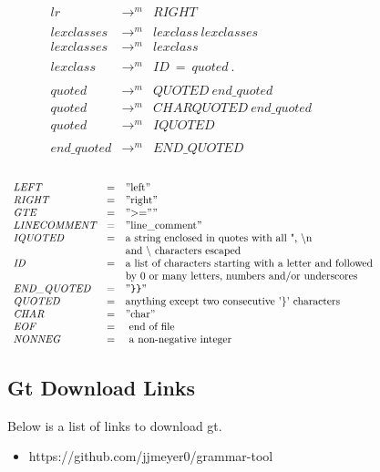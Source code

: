 \[\begin{array}{lll}
\textit{lr} & \to^m & \textit{RIGHT} \\ \\
\textit{lexclasses} & \to^m & \textit{lexclass}\ \textit{lexclasses} \\
\textit{lexclasses} & \to^m & \textit{lexclass} \\ \\
\textit{lexclass} & \to^m & \textit{ID}\ =\ \textit{quoted}\ . \\ \\
\textit{quoted} & \to^m & \textit{QUOTED}\ \textit{end\_quoted} \\
\textit{quoted} & \to^m & \textit{CHAR} \textit{QUOTED}\ \textit{end\_quoted} \\
\textit{quoted} & \to^m & \textit{IQUOTED} \ \ \ \ \ \ \ \ \ \ \ \ \ \ \ \ \ \ \ \ \ \ \ \ \ \ \ \ \ \ \ \ \ \ \ \ \ \ \ \ \ \ \ \ \ \ \ \ \ \ \ \ \ \ \ \ \ \ \ \ \ \ \ \ \ \ \ \ \ \ \ \ \ \ \\ \\
\textit{end\_quoted} & \to^m & \textit{END\_QUOTED}\\ \\ 
\end{array}
\]


\[
\begin{array}{lll}
\textit{LEFT} & = & "\textnormal{left}" \ \ \ \ \ \ \ \ \ \ \ \ \ \ \ \ \ \ \ \ \ \ \ \ \ \ \ \ \ \ \ \ \ \ \ \ \ \ \ \ \ \ \ \ \ \ \ \ \ \ \ \ \ \ \ \ \ \ \ \ \ \ \ \ \ \ \ \ \ \ \ \ \ \ \ \ \ \ \ \ \ \ \ \ \ \ \ \ \\
\textit{RIGHT} & = & "\textnormal{right}" \\
\textit{GTE} & = & "\textnormal{$>$=}"" \\
\textit{LINECOMMENT} & = & "\textnormal{line\_comment}"\\
\textit{IQUOTED} & = & \textnormal{a string enclosed in quotes with all ",  \textbackslash n} \\
\ & \  & \textnormal{and \textbackslash \ characters escaped} \\
\textit{ID} & = & \textnormal{a list of characters starting with a letter and followed } \\
\  & \  & \textnormal{by 0 or many letters, numbers and/or underscores} \\
\textit{END\_QUOTED} & = & "\texttt{\}\}}" \\
\textit{QUOTED} & = & \textnormal{anything except two consecutive '\}' characters} \\
\textit{CHAR} & = & "\textnormal{char}" \\
\textit{EOF} & = &  \textnormal{ end of file } \\
\textit{NONNEG} & = & \textnormal{ a non-negative integer } \\ 
\end{array}
\]

\subsection{Gt Download Links}
Below is a list of links to download gt.
\begin{itemize}
\item https://github.com/jjmeyer0/grammar-tool
\end{itemize}

